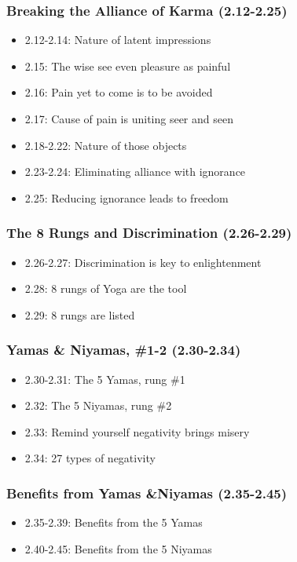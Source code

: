 \begin{frame}[fragile]\frametitle{Breaking the Alliance of Karma (2.12-2.25)}
\begin{itemize}
\item 2.12-2.14: Nature of latent impressions
\item 2.15: The wise see even pleasure as painful
\item 2.16: Pain yet to come is to be avoided
\item 2.17: Cause of pain is uniting seer and seen
\item 2.18-2.22: Nature of those objects
\item 2.23-2.24: Eliminating alliance with ignorance
\item 2.25: Reducing ignorance leads to freedom
\end{itemize}  
\end{frame}

\begin{frame}[fragile]\frametitle{The 8 Rungs and Discrimination (2.26-2.29)}
\begin{itemize}
\item 2.26-2.27: Discrimination is key to enlightenment
\item 2.28: 8 rungs of Yoga are the tool  
\item 2.29: 8 rungs are listed
\end{itemize}
\end{frame}

\begin{frame}[fragile]\frametitle{Yamas \& Niyamas, \#1-2 (2.30-2.34)}
\begin{itemize}
\item 2.30-2.31: The 5 Yamas, rung \#1
\item 2.32: The 5 Niyamas, rung \#2
\item 2.33: Remind yourself negativity brings misery
\item 2.34: 27 types of negativity
\end{itemize}
\end{frame}

\begin{frame}[fragile]\frametitle{Benefits from Yamas \&Niyamas (2.35-2.45)}
\begin{itemize}
\item 2.35-2.39: Benefits from the 5 Yamas
\item 2.40-2.45: Benefits from the 5 Niyamas
\end{itemize}
\end{frame}

